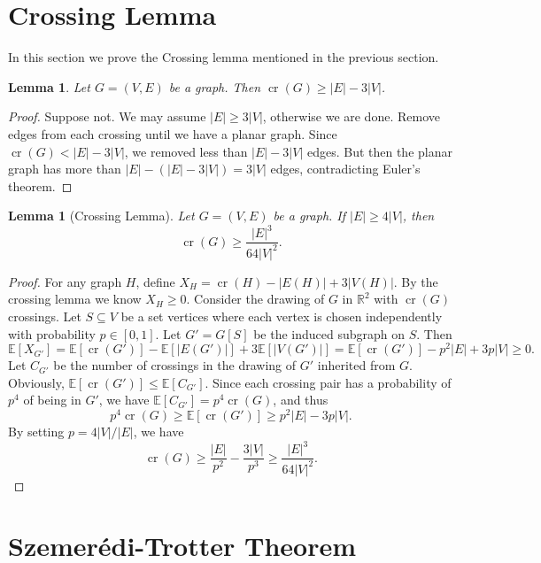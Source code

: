 \documentclass[12pt,reqno]{amsart}
\newtheorem{lemma}[theorem]{Lemma}
\theoremstyle{definition}
\theoremstyle{remark}
\renewcommand{\leq}{\leqslant}
\renewcommand{\geq}{\geqslant}
\def\R{\mathbb{R}}
\def\E{\mathbb{E}}
\def\cr{\operatorname{cr}}
\numberwithin{equation}{section}
\begin{document}
\newpage

\section{Crossing Lemma}

In this section we prove the Crossing lemma mentioned in the previous section. 


\begin{lemma}
	Let $G = (V, E)$ be a graph. Then $\cr(G) \geq |E| - 3|V|$. 
\end{lemma}

\begin{proof}
	Suppose not. We may assume $|E| \geq 3|V|$, otherwise we are done. Remove edges from each crossing until we have a planar graph. Since $\cr(G) < |E| - 3|V|$, we removed less than $|E| - 3|V|$ edges. But then the planar graph has more than $|E| - (|E| - 3|V|) = 3|V|$ edges, contradicting Euler's theorem. 
\end{proof}

\begin{lemma}[Crossing Lemma]
	Let $G = (V, E)$ be a graph. If $|E| \geq 4|V|$, then
	\[
		\cr(G) \geq \frac{|E|^3}{64|V|^2}.
	\]
\end{lemma}

\begin{proof}
	For any graph $H$, define $X_H = \cr(H) - |E(H)| + 3|V(H)|$. By the crossing lemma we know $X_H \geq 0$. Consider the drawing of $G$ in $\R^2$ with $\cr(G)$ crossings. Let $S \subseteq V$ be a set vertices where each vertex is chosen independently with probability $p \in [0, 1]$. Let $G' = G[S]$ be the induced subgraph on $S$. Then
	\[
		\E[X_{G'}] = \E[\cr(G')] - \E[|E(G')|] + 3\E[|V(G')|] = \E[\cr(G')] - p^2|E| + 3p|V| \geq 0.
	\]
	Let $C_{G'}$ be the number of crossings in the drawing of $G'$ inherited from $G$. Obviously, $\E[\cr(G')] \leq \E[C_{G'}]$. Since each crossing pair has a probability of $p^4$ of being in $G'$, we have $\E[C_{G'}] = p^4\cr(G)$, and thus
	\[
		p^4\cr(G) \geq \E[\cr(G')] \geq p^2|E| - 3p|V|.
	\]
	By setting $p = 4|V|/|E|$, we have
	\[
		\cr(G) \geq \frac{|E|}{p^2} - \frac{3|V|}{p^3} \geq \frac{|E|^3}{64|V|^2}.
	\]
\end{proof}

\newpage

\section{Szemerédi-Trotter Theorem}
\end{document}
